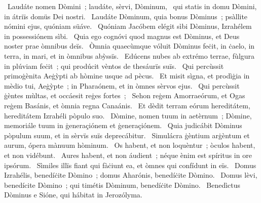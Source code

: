 ~Laudáte nomen Dòmini~; laudáte, sèrvi, Dòminum, 
~qui statis in domu Dòmini, in átriïs domüs Dei nostri. 
~Laudáte Dòminum, quia bonus Dòminus~; psàllite nómini ejus, quóniam süáve. 
~Quóniam Jacóbem elégit sìbi Dòminus, Izrahélem in possessiónem sìbi. 
~Quia ego cognóvi quod magnus est Dòminus, et Deus noster prae òmnibus deïs. 
~Òmnia quaecùmque vóluit Dòminus feċit, in ċaelo, in terra, in mari, et in òmnibus abỳssïs. 
~Edúcens nubes ab extrémo terrae, fùlgura in plúviam feċit~; qui prodúcit vèntos de thesáurïs suïs. 
~Qui percùssit primoġènita Aeġỳpti ab hòmine usque ad pècus. 
~Et misit sìgna, et prodìġia in mèdio tui, Aeġỳpte~; in Pharaónem, et in òmnes sèrvos ejus. 
~Qui percùssit ġèntes mùltas, et occáesit reġes fortes~; 
~Sehon reġem Amorraeórum, et Ogas reġem Basánis, et òmnia regna Canaánis. 
~Et dèdit terram eórum hereditátem, hereditátem Izrahéli pòpulo suo. 
~Dòmine, nomen tuum in aetèrnum~; Dòmine, memoriále tuum in ġeneraçiónem et ġeneraçiónem. 
~Quia judicábit Dòminus pòpulum suum, et in sèrvïs suïs deprecábitur. 
~Simulácra ġèntium arġèntum et aurum, ópera mànuum hòminum. 
~Os habent, et non loquèntur~; òculos habent, et non vidébunt. 
~Aures habent, et non áudient~; néque ènim est spíritus in ore ipsórum. 
~Sìmiles illïs fiant qui fàċiunt ea, et òmnes qui confídunt in eïs. 
~Domus Izrahélis, benedíċite Dòmino~; domus Aharónis, benedíċite Dòmino. 
~Domus lèvi, benedícite Dòmino~; qui timétis Dòminum, benedíċite Dòmino. 
~Benedìctus Dòminus e Sióne, qui hábitat in Jerozólyma. 
